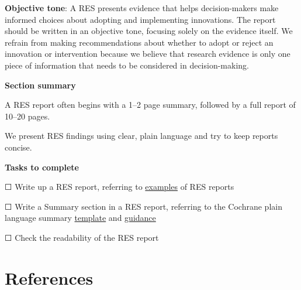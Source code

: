 \documentclass[
  letterpaper,
  DIV=11,
  numbers=noendperiod]{scrreprt}
\begin{document}
\textbf{Objective tone}: A RES presents evidence that helps
decision-makers make informed choices about adopting and implementing
innovations. The report should be written in an objective tone, focusing
solely on the evidence itself. We refrain from making recommendations
about whether to adopt or reject an innovation or intervention because
we believe that research evidence is only one piece of information that
needs to be considered in decision-making.

\textbf{Section summary}

A RES report often begins with a 1--2 page summary, followed by a full
report of 10--20 pages.

We present RES findings using clear, plain language and try to keep
reports concise.

\textbf{Tasks to complete}

☐ Write up a RES report, referring to
\href{https://arc-gm.nihr.ac.uk/rapid-evidence-synthesis}{examples} of
RES reports

☐ Write a Summary section in a RES report, referring to the Cochrane
plain language summary
\href{https://view.officeapps.live.com/op/view.aspx?src=https\%3A\%2F\%2Fwww.cochrane.org\%2Fauthors\%2Fhandbooks-and-manuals\%2Fhandbook\%2Fcurrent\%2Ftemplate-writing-cochrane-plain-language-summary.docx&wdOrigin=BROWSELINK}{template}
and
\href{https://training.cochrane.org/system/files/uploads/protected_file/GUIDAN~1.PDF\#page=8}{guidance}

☐ Check the readability of the RES report


\chapter*{References}\label{references}


\protect{}\label{refs}
\end{document}
